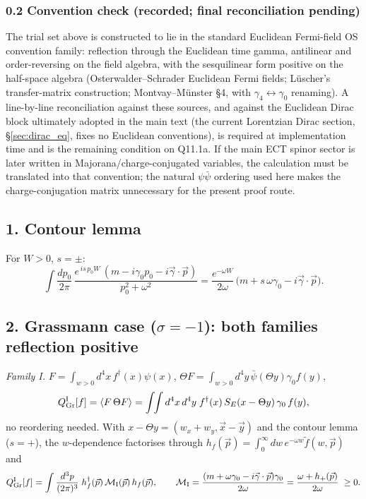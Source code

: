 \subsubsection*{0.2 Convention check (recorded; final
reconciliation pending)}
The trial set above is constructed to lie in the standard Euclidean
Fermi-field OS convention family: reflection through the Euclidean
time gamma, antilinear and order-reversing on the field algebra,
with the sesquilinear form positive on the half-space algebra
(Osterwalder--Schrader Euclidean Fermi fields; L\"uscher's
transfer-matrix construction; Montvay--M\"unster \S4, with
$\gamma_4\leftrightarrow\gamma_0$ renaming).
A line-by-line reconciliation against these sources, and against
the Euclidean Dirac block ultimately adopted in the main text
(the current Lorentzian Dirac section, \S\ref{sec:dirac_eq}, fixes no Euclidean conventions), is required at
implementation time and is the remaining condition on Q11.1a.
If the main ECT spinor sector is later written in
Majorana/charge-conjugated variables, the calculation must be
translated into that convention; the natural $\psi\bar\psi$
ordering used here makes the charge-conjugation matrix unnecessary
for the present proof route.

\subsection*{1. Contour lemma}
For $W>0$, $s=\pm$:
\[
\int\frac{dp_0}{2\pi}\,
\frac{e^{\,is\,p_0W}\,(m-i\gamma_0p_0-i\vec\gamma\cdot\vec p)}
{p_0^2+\omega^2}
=\frac{e^{-\omega W}}{2\omega}\,
\bigl(m+s\,\omega\gamma_0-i\vec\gamma\cdot\vec p\bigr).
\]

\subsection*{2. Grassmann case ($\sigma=-1$): both families
reflection positive}
\emph{Family I.}
$F=\int_{w>0}d^4x\,f^\dagger(x)\psi(x)$,
$\Theta F=\int_{w>0}d^4y\,\bar\psi(\Theta y)\gamma_0 f(y)$,
\[
Q_{\rm Gr}^{\rm I}[f]
=\langle F\,\Theta F\rangle
=\int\!\!\int d^4x\,d^4y\;
f^\dagger(x)\,S_E(x-\Theta y)\,\gamma_0\,f(y),
\]
no reordering needed.
With $x-\Theta y=(w_x+w_y,\vec x-\vec y)$ and the contour lemma
($s=+$), the $w$-dependence factorises through
$h_f(\vec p)=\int_0^\infty dw\,e^{-\omega w}\tilde f(w,\vec p)$ and
\[
Q_{\rm Gr}^{\rm I}[f]
=\int\frac{d^3p}{(2\pi)^3}\;
h_f^\dagger(\vec p)\,\mathcal M_{\rm I}(\vec p)\,h_f(\vec p),
\qquad
\mathcal M_{\rm I}
=\frac{(m+\omega\gamma_0-i\vec\gamma\cdot\vec p)\gamma_0}{2\omega}
=\frac{\omega+h_+(\vec p)}{2\omega}\;\ge0 .
\]

